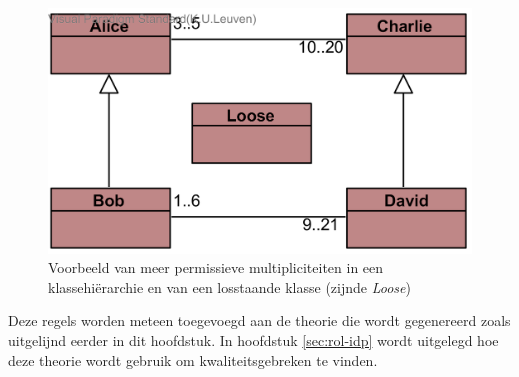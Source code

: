 \begin{figure}
	\label{fig:hierarchie}
	\includegraphics{chap-kwaliteitsgebrek/hierarchy.png}
	\caption{Voorbeeld van meer permissieve multipliciteiten in een klassehi\"erarchie en van een losstaande klasse (zijnde \textit{Loose})}
\end{figure}

Deze regels worden meteen toegevoegd aan de theorie die wordt gegenereerd zoals uitgelijnd eerder in dit hoofdstuk. In hoofdstuk \ref{sec:rol-idp} wordt uitgelegd hoe deze theorie wordt gebruik om kwaliteitsgebreken te vinden.